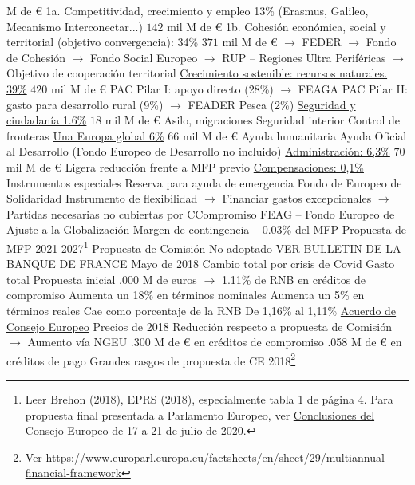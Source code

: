 \documentclass{nuevotema}
\begin{document}
\begin{esquemal}
				 M de €
				\4[] 1a. Competitividad, crecimiento y empleo 13\% (Erasmus, Galileo, Mecanismo Interconectar...)
				\4[] $142$ mil M de €
				\4[] 1b. Cohesión económica, social y territorial (objetivo convergencia): 34\%
				\4[] $371$ mil M de €
				\4[] $\to$ FEDER
				\4[] $\to$ Fondo de Cohesión
				\4[] $\to$ Fondo Social Europeo
				\4[] $\to$ RUP -- Regiones Ultra Periféricas
				\4[] $\to$ Objetivo de cooperación territorial
				\4[2] \underline{Crecimiento sostenible: recursos naturales. 39\%}
				\4[] $420$ mil M de €
				\4[] PAC Pilar I: apoyo directo (28\%)
				\4[] $\to$ FEAGA
				\4[] PAC Pilar II: gasto para desarrollo rural (9\%)
				\4[] $\to$ FEADER
				\4[] Pesca (2\%)
				\4[3] \underline{Seguridad y ciudadanía 1.6\%}
				\4[] $18$ mil M de €
				\4[] Asilo, migraciones
				\4[] Seguridad interior
				\4[] Control de fronteras
				\4[4] \underline{Una Europa global 6\%}
				\4[] $66$ mil M de €
				\4[] Ayuda humanitaria
				\4[] Ayuda Oficial al Desarrollo
				\4[] (Fondo Europeo de Desarrollo no incluido)
				\4[5] \underline{Administración: 6,3\%}
				\4[] $70$ mil M de €
				\4[] Ligera reducción frente a MFP previo
				\4[6] \underline{Compensaciones: 0,1\%}
				\4 Instrumentos especiales
				\4[] Reserva para ayuda de emergencia
				\4[] Fondo de Europeo de Solidaridad
				\4[] Instrumento de flexibilidad
				\4[] $\to$ Financiar gastos excepcionales
				\4[] $\to$ Partidas necesarias no cubiertas por CCompromiso
				\4[] FEAG -- Fondo Europeo de Ajuste a la Globalización
				\4[] Margen de contingencia -- $0.03\%$ del MFP
		\2 Propuesta de MFP 2021-2027\footnote{Leer Brehon (2018), EPRS (2018), especialmente tabla 1 de página 4. Para propuesta final presentada a Parlamento Europeo, ver \href{https://www.consilium.europa.eu/media/45109/210720-euco-final-conclusions-en.pdf}{Conclusiones del Consejo Europeo de 17 a 21 de julio de 2020}.}
			\3 Propuesta de Comisión
				\4 No adoptado
				\4 VER BULLETIN DE LA BANQUE DE FRANCE
				\4 Mayo de 2018
				\4 Cambio total por crisis de Covid
			\3 Gasto total
				\4 Propuesta inicial
				.000 M de euros
				\4[] $\to$ 1.11\% de RNB en créditos de compromiso
				\4 Aumenta un 18\% en términos nominales
				\4 Aumenta un 5\% en términos reales
				\4 Cae como porcentaje de la RNB
				\4[] De 1,16\% al 1,11\%
				\4 \underline{Acuerdo de Consejo Europeo}
				\4[] Precios de 2018
				\4[] Reducción respecto a propuesta de Comisión
				\4[] $\to$ Aumento vía NGEU
				.300 M de € en créditos de compromiso
				.058 M de € en créditos de pago
			\3 Grandes rasgos de propuesta de CE 2018\footnote{Ver \url{https://www.europarl.europa.eu/factsheets/en/sheet/29/multiannual-financial-framework}}

\end{esquemal}
\end{document}
